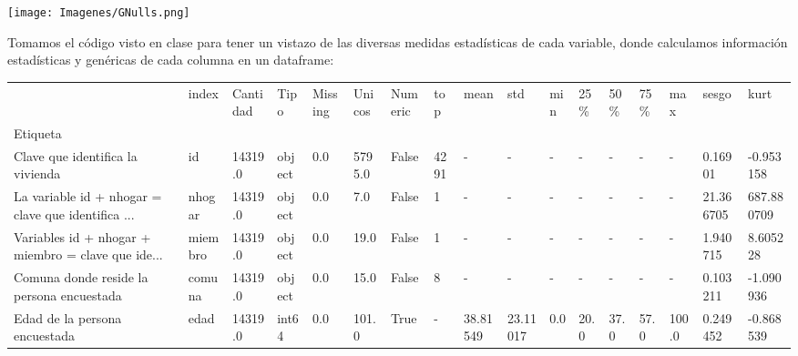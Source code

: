 \documentclass[a4paper]{article}
\begin{document}
    \texttt{[image: Imagenes/GNulls.png]}

    Tomamos el código visto en clase para tener un vistazo de las diversas medidas estadísticas de cada variable, donde calculamos información estadísticas y genéricas de cada columna en un dataframe:

    \begin{landscape}
    \resizebox{24cm}{!} {
    \begin{tabular}{lllllllllllllllll}
        \toprule
        {} &                        index & Cantidad &     Tipo & Missing &  Unicos & Numeric &                            top &          mean &           std &  min &      25\% &      50\% &      75\% &        max &      sesgo &        kurt \\
        Etiqueta                                           &                              &          &          &         &         &         &                                &               &               &      &          &          &          &            &            &             \\
        \midrule
        Clave que identifica la vivienda                   &                           id &  14319.0 &   object &     0.0 &  5795.0 &   False &                           4291 &             - &             - &    - &        - &        - &        - &          - &    0.16901 &   -0.953158 \\
        La variable id + nhogar = clave que identifica ... &                       nhogar &  14319.0 &   object &     0.0 &     7.0 &   False &                              1 &             - &             - &    - &        - &        - &        - &          - &  21.366705 &  687.880709 \\
        Variables id + nhogar + miembro = clave que ide... &                      miembro &  14319.0 &   object &     0.0 &    19.0 &   False &                              1 &             - &             - &    - &        - &        - &        - &          - &   1.940715 &    8.605228 \\
        Comuna donde reside la persona encuestada          &                       comuna &  14319.0 &   object &     0.0 &    15.0 &   False &                              8 &             - &             - &    - &        - &        - &        - &          - &   0.103211 &   -1.090936 \\
        Edad de la persona encuestada                      &                         edad &  14319.0 &    int64 &     0.0 &   101.0 &    True &                              - &      38.81549 &      23.11017 &  0.0 &     20.0 &     37.0 &     57.0 &      100.0 &   0.249452 &   -0.868539 \\

\end{tabular}}
\end{landscape}
\end{document}
